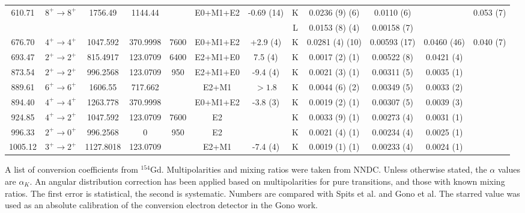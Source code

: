 \begin{sidewaystable}
\begin{longtable}{c|c|c|c|c|c|c|c|c|c|c|c}
        \hline
        610.71	&	$8^+	\rightarrow	8^+$	&	1756.49	&	1144.44	&		&	E0+M1+E2	&	-0.69 (14)	& K &	0.0236	(9) (6)	&	0.0110 (6)	& &	0.053 (7)	\\
	    &				&		&		&		&		&	& L	&	0.0153	(8) (4)	&	0.00158 (7)	&		\\
	    \hline
        676.70	&	$4^+	\rightarrow	4^+$	&	1047.592	&	370.9998	&	7600	&	E0+M1+E2	&	+2.9 (4)	& K &	0.0281	(4) (10)	&	0.00593 (17)	&	0.0460 (46) & 0.040 (7)	\\
        \hline
        693.47	&	$2^+	\rightarrow	2^+$	&	815.4917	&	123.0709	&	6400	&	E2+M1+E0	&	7.5 (4)	& K &	0.0017	(2) (1)	&	0.00522 (8)	&	0.0421 (4)	\\
        \hline
        873.54	&	$2^+	\rightarrow	2^+$	&	996.2568	&	123.0709	&	950	&	E2+M1+E0	&	-9.4 (4)	& K &	0.0021	(3)	(1) &	0.00311 (5)	&	0.0035 (1)	\\
        \hline
        889.61	&	$6^+	\rightarrow	6^+$	&	1606.55	&	717.662	&		&	E2+M1	&	$>1.8$	& K &	0.0044	(6) (2)	&	0.00349 (5)	&	0.0033 (2)	\\
        \hline
        894.40	&	$4^+	\rightarrow	4^+$	&	1263.778	&	370.9998	&		&	E0+M1+E2	&	-3.8 (3)	& K &	0.0019	(2) (1)	&	0.00307 (5)	&	0.0039 (3)	\\
        \hline
        924.85	&	$4^+	\rightarrow	2^+$	&	1047.592	&	123.0709	&	7600	&	E2	&	& K	&	0.0033	(9) (1)	&	0.00273 (4)	&	0.0031 (1)	\\
        \hline
        996.33	&	$2^+	\rightarrow	0^+$	&	996.2568	&	0	&	950	&	E2	&	& K	&	0.0021	(4) (1)	&	0.00234 (4)	&	0.0025 (1)	\\
        \hline
        1005.12	&	$3^+	\rightarrow	2^+$	&	1127.8018	&	123.0709	&		&	E2+M1	&	-7.4 (4) & K	&	0.0019	(1) (1)	&	0.00233 (4)	&	0.0024 (1)	\\
        \bottomrule
    \end{longtable}
    \item{A list of conversion coefficients from $^{154}$Gd. Multipolarities and mixing ratios were taken from NNDC. Unless otherwise stated, the $\alpha$ values are $\alpha_K$. An angular distribution correction has been applied based on multipolarities for pure transitions, and those with known mixing ratios. The first error is statistical, the second is systematic. Numbers are compared with Spits et al.\citep{spits96:_154gd} and Gono et al.\citep{gono74:_154gd_e0} The starred value was used as an absolute calibration of the conversion electron detector in the Gono work.}
\end{sidewaystable}